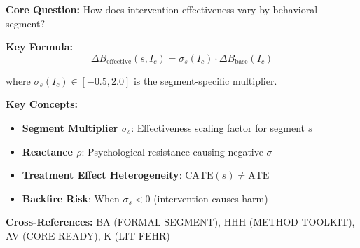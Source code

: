 \begin{tcolorbox}[colback=blue!5!white, colframe=blue!75!black,
    title=Quick Reference: Segment-Type Multiplier]

\textbf{Core Question:} How does intervention effectiveness vary by behavioral segment?

\textbf{Key Formula:}
\begin{equation}
\Delta B_{\text{effective}}(s, I_c) = \sigma_s(I_c) \cdot \Delta B_{\text{base}}(I_c)
\end{equation}

where $\sigma_s(I_c) \in [-0.5, 2.0]$ is the segment-specific multiplier.

\textbf{Key Concepts:}
\begin{itemize}[nosep]
\item \textbf{Segment Multiplier $\sigma_s$}: Effectiveness scaling factor for segment $s$
\item \textbf{Reactance $\rho$}: Psychological resistance causing negative $\sigma$
\item \textbf{Treatment Effect Heterogeneity}: $\text{CATE}(s) \neq \text{ATE}$
\item \textbf{Backfire Risk}: When $\sigma_s < 0$ (intervention causes harm)
\end{itemize}

\textbf{Cross-References:} BA (FORMAL-SEGMENT), HHH (METHOD-TOOLKIT), AV (CORE-READY), K (LIT-FEHR)

\end{tcolorbox}


